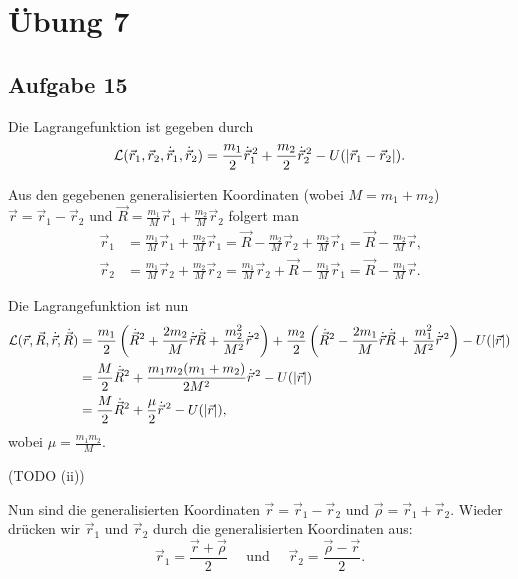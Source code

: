 \chapter*{Übung 7}

\section*{Aufgabe 15}

Die Lagrangefunktion ist gegeben durch
\[
	\mathcal{L}(\vec{r}_1, \vec{r}_2, \dot{\vec{r}}_1, \dot{\vec{r}}_2) 
	= \frac{m_1}{2} \dot{\vec{r}}_1^{\,2} + \frac{m_2}{2} \dot{\vec{r}}_2^{\,2} - U(\left\lvert \vec{r}_1 - \vec{r}_2 \right\rvert)
	\text{.}
\]

Aus den gegebenen generalisierten Koordinaten (wobei $M = m_1 + m_2$) $\vec{r} = \vec{r}_1 - \vec{r}_2$ und $\vec{R} = \frac{m_1}{M} \vec{r}_1 + \frac{m_2}{M} \vec{r}_2$ folgert man
\begin{align*}
	\vec{r}_1 
	&= \frac{m_1}{M} \vec{r}_1 + \frac{m_2}{M} \vec{r}_1 
	= \vec{R} - \frac{m_2}{M} \vec{r}_2 + \frac{m_2}{M} \vec{r}_1
	= \vec{R} - \frac{m_2}{M} \vec{r} 
	\text{,} \\
	\vec{r}_2 
	&= \frac{m_1}{M} \vec{r}_2 + \frac{m_2}{M} \vec{r}_2
	= \frac{m_1}{M} \vec{r}_2 + \vec{R} - \frac{m_1}{M} \vec{r}_1
	= \vec{R} - \frac{m_1}{M} \vec{r}
	\text{.}
\end{align*}

Die Lagrangefunktion ist nun
\begin{align*}
	\mathcal{L}(\vec{r}, \vec{R}, \dot{\vec{r}}, \dot{\vec{R}})
	&= \frac{m_1}{2} \left( \dot{\vec{R}}^2 + \frac{2 m_2}{M} \dot{\vec{r}} \dot{\vec{R}} + \frac{m_2^2}{M^2} \dot{\vec{r}}^{\,2} \right)	
	+ \frac{m_2}{2} \left( \dot{\vec{R}}^2 - \frac{2 m_1}{M} \dot{\vec{r}} \dot{\vec{R}} + \frac{m_1^2}{M^2} \dot{\vec{r}}^{\,2} \right)
	- U(\left\lvert \vec{r} \right\rvert) \\
	&= \frac{M}{2} \dot{\vec{R}}^2 + \frac{m_1 m_2 (m_1 + m_2)}{2 M^2} \dot{\vec{r}}^{\,2} - U(\left\lvert \vec{r} \right\rvert) \\
	&= \frac{M}{2} \dot{\vec{R}}^2 + \frac{\mu}{2} \dot{\vec{r}}^{\,2} - U(\left\lvert \vec{r} \right\rvert)
	\text{,}
\end{align*}
wobei $\mu = \frac{m_1 m_2}{M}$.

(TODO (ii))

Nun sind die generalisierten Koordinaten $\vec{r} = \vec{r}_1 - \vec{r}_2$ und $\vec{\rho} = \vec{r}_1 + \vec{r}_2$. Wieder drücken wir $\vec{r}_1$ und $\vec{r}_2$ durch die generalisierten Koordinaten aus:
\[
	\vec{r}_1 = \frac{\vec{r} + \vec{\rho}}{2}
	\quad \text{ und } \quad 
	\vec{r}_2 = \frac{\vec{\rho} - \vec{r}}{2}
	\text{.}
\]

